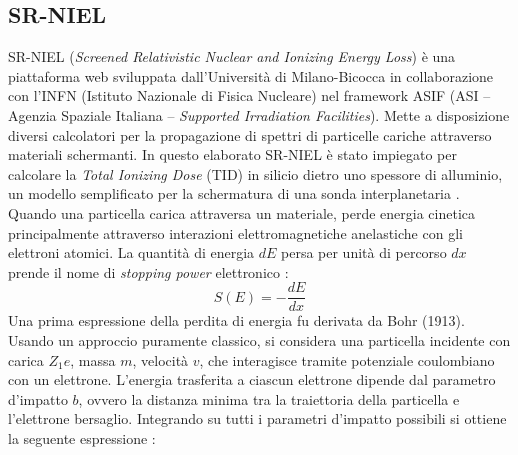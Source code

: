 \documentclass[12pt]{report}
\begin{document}
\subsection{SR-NIEL}
SR-NIEL (\textit{Screened Relativistic Nuclear and Ionizing Energy Loss}) \cite{sr_niel_calculator} è una piattaforma web sviluppata dall'Università di Milano-Bicocca in collaborazione con l'INFN (Istituto Nazionale di Fisica Nucleare) nel framework ASIF (ASI -- Agenzia Spaziale Italiana -- \textit{Supported Irradiation Facilities}). Mette a disposizione diversi calcolatori per la propagazione di spettri di particelle cariche attraverso materiali schermanti. In questo elaborato SR-NIEL è stato impiegato per calcolare la \textit{Total Ionizing Dose} (TID) in silicio dietro uno spessore di alluminio, un modello semplificato per la schermatura di una sonda interplanetaria  \cite{sr_niel_stopping_power}.\\
Quando una particella carica attraversa un materiale, perde energia cinetica principalmente attraverso interazioni elettromagnetiche anelastiche con gli elettroni atomici. La quantità di energia $dE$ persa per unità di percorso $dx$ prende il nome di \textit{stopping power} elettronico \cite{Leroy_principles_of_radiation}:
\begin{equation}
    S(E) = -\frac{dE}{dx}    
\end{equation}
Una prima espressione della perdita di energia fu derivata da Bohr (1913). Usando un approccio puramente classico, si considera una particella incidente con carica $Z_1e$, massa $m$, velocità $v$, che interagisce tramite potenziale coulombiano con un elettrone. L'energia trasferita a ciascun elettrone dipende dal parametro d'impatto $b$, ovvero la distanza minima tra la traiettoria della particella e l'elettrone bersaglio. Integrando su tutti i parametri d'impatto possibili si ottiene la seguente espressione \cite{Leroy_principles_of_radiation}: 
\end{document}
